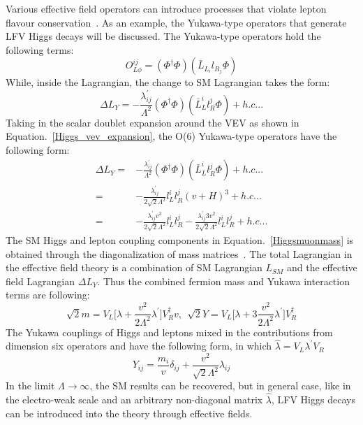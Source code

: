 Various effective field operators can introduce processes that violate lepton flavour conservation~\cite{PhysRevD.62.116005}. As an example, the Yukawa-type operators that generate LFV Higgs decays will be discussed. The Yukawa-type operators hold the following terms:
\begin{equation}
O^{ij}_{L\phi}=(\Phi^{\dagger}\Phi)(\bar{L}_{L_{i}}l_{R_{j}}\Phi)
\end{equation}
While, inside the Lagrangian, the change to SM Lagrangian takes the form:
\begin{equation}
\Delta L_{Y}=-\frac{\lambda^{'}_{ij}}{\Lambda^{2}}(\Phi^{\dagger}\Phi)(\bar{L}^{i}_{L}l^{j}_{R}\Phi)+h.c...
\end{equation}
Taking in the scalar doublet expansion around the VEV as shown in Equation.~\ref{Higgs_vev_expansion}, the O(6) Yukawa-type operators have the following form:
\begin{equation}
\begin{aligned}
\Delta L_{Y}=&-\frac{\lambda^{'}_{ij}}{\Lambda^{2}}(\Phi^{\dagger}\Phi)(\bar{L}^{i}_{L}l^{j}_{R}\Phi)+h.c...\\
         =&-\frac{\lambda^{'}_{ij}}{2\sqrt{2}\Lambda^{2}}l_{L}^{i}l_{R}^{j}(v+H)^{3}+h.c...\\
         =&-\frac{\lambda^{'}_{ij}v^{3}}{2\sqrt{2}\Lambda^{2}}l_{L}^{i}l_{R}^{j}-\frac{\lambda^{'}_{ij}3v^{2}}{2\sqrt{2}\Lambda^{2}}l_{L}^{i}l_{R}^{j}+h.c...
\end{aligned}
\end{equation}
The SM Higgs and lepton coupling components in Equation.~\ref{Higgsmuonmass} is obtained through the diagonalization of mass matrices~\cite{Harnik:2012pb}. The total Lagrangian in the effective field theory is a combination of SM Lagrangian $L_{SM}$ and the effective field Lagrangian $\Delta L_{Y}$. Thus the combined fermion mass and Yukawa interaction terms are following:
\begin{equation}
\sqrt{2}m=V_{L}\Big[\lambda+\frac{v^{2}}{2\Lambda^{2}}\lambda^{'}\Big]V^{\dagger}_{R}v,~~\sqrt{2}Y=V_{L}\Big[\lambda+3\frac{v^{2}}{2\Lambda^{2}}\lambda^{'}\Big]V^{\dagger}_{R}
\end{equation}
The Yukawa couplings of Higgs and leptons mixed in the contributions from dimension six operators and have the following form, in which $\hat{\lambda}=V_{L}\lambda^{'}V_{R}$
\begin{equation}
Y_{ij}=\frac{m_{i}}{v}\delta_{ij}+\frac{v^{2}}{\sqrt{2}\Lambda^{2}}\hat{\lambda}_{ij}
\end{equation}
In the limit $\Lambda \to \infty$, the SM results can be recovered, but in general case, like in the electro-weak scale and an arbitrary non-diagonal matrix $\hat{\lambda}$, LFV Higgs decays can be introduced into the theory through effective fields.

